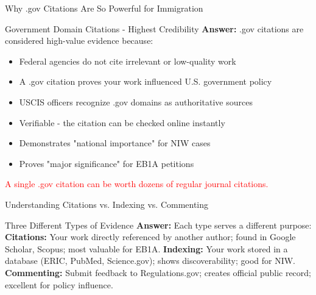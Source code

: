 \documentclass[11pt]{beamer}
\begin{document}
	\begin{frame}{Why .gov Citations Are So Powerful for Immigration}
		\small
		\begin{block}{Government Domain Citations - Highest Credibility}
			\textbf{Answer:} .gov citations are considered high-value evidence because:
			\vspace{0.1cm}
			\begin{itemize}
				\item Federal agencies do not cite irrelevant or low-quality work
				\item A .gov citation proves your work influenced U.S. government policy
				\item USCIS officers recognize .gov domains as authoritative sources
				\item Verifiable - the citation can be checked online instantly
				\item Demonstrates "national importance" for NIW cases
				\item Proves "major significance" for EB1A petitions
			\end{itemize}
			\textcolor{red}{A single .gov citation can be worth dozens of regular journal citations.}
		\end{block}
	\end{frame}
	
	\begin{frame}{Understanding Citations vs. Indexing vs. Commenting}
		\small
		\begin{block}{Three Different Types of Evidence}
			\textbf{Answer:} Each type serves a different purpose:
			\vspace{0.1cm}
			\textbf{Citations:} Your work directly referenced by another author; found in Google Scholar, Scopus; most valuable for EB1A.
			\vspace{0.1cm}
			\textbf{Indexing:} Your work stored in a database (ERIC, PubMed, Science.gov); shows discoverability; good for NIW.
			\vspace{0.1cm}
			\textbf{Commenting:} Submit feedback to Regulations.gov; creates official public record; excellent for policy influence.
		\end{block}
	\end{frame}
	
\end{document}

